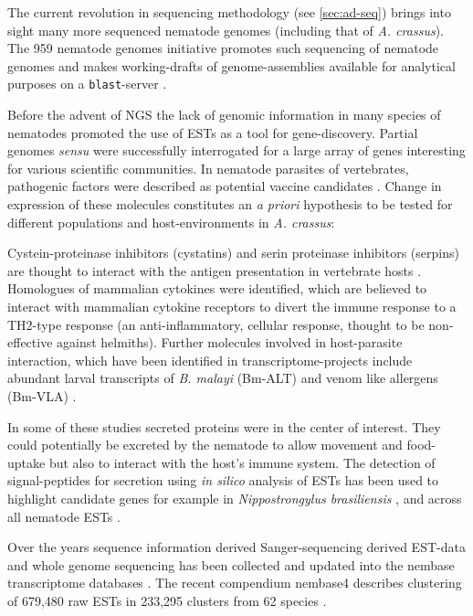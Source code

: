 The current revolution in sequencing methodology (see
\ref{sec:ad-seq}) brings into sight many more sequenced nematode
genomes (including that of \textit{A. crassus}). The 959 nematode
genomes initiative promotes such sequencing of nematode genomes and
makes working-drafts of genome-assemblies available for analytical
purposes on a \texttt{blast}-server \cite{pmid22058131} .

Before the advent of NGS the lack of genomic information in many
species of nematodes promoted the use of ESTs as a tool for
gene-discovery. Partial genomes \textit{sensu}
\cite{parkinson_partigene--constructing_2004} were successfully
interrogated for a large array of genes interesting for various
scientific communities. In nematode parasites of vertebrates,
pathogenic factors were described as potential vaccine candidates
\cite{pmid11406138}. Change in expression of these molecules
constitutes an \textit{a priori} hypothesis to be tested for different
populations and host-environments in \textit{A. crassus}:

Cystein-proteinase inhibitors (cystatins) and serin proteinase
inhibitors (serpins) are thought to interact with the antigen
presentation in vertebrate hosts \cite{pmid11406138}. Homologues of
mammalian cytokines were identified, which are believed to interact
with mammalian cytokine receptors to divert the immune response to a
TH2-type response \cite{maizels_helminth_2004} (an anti-inflammatory,
cellular response, thought to be non-effective against
helmiths). Further molecules involved in host-parasite interaction,
which have been identified in transcriptome-projects include abundant
larval transcripts of \textit{B. malayi} (Bm-ALT)
\cite{gomez-escobar_abundant_2002} and venom like allergens (Bm-VLA)
\cite{pmid11704277}.

In some of these studies secreted proteins were in the center of
interest. They could potentially be excreted by the nematode to allow
movement and food-uptake but also to interact with the host's immune
system. The detection of signal-peptides for secretion using
\textit{in silico} analysis of ESTs has been used to highlight
candidate genes for example in \textit{Nippostrongylus brasiliensis}
\cite{harcus_signal_2004}, and across all nematode ESTs
\cite{nagaraj_needles_2008}.

Over the years sequence information derived Sanger-sequencing derived
EST-data and whole genome sequencing has been collected and updated
into the nembase transcriptome databases
\cite{parkinson_nembase:resource_2004,wasmuth_extent_2008}. The recent
compendium nembase4 describes clustering of 679,480 raw ESTs in 233,295
clusters from 62 species \cite{pmid21550347}.

